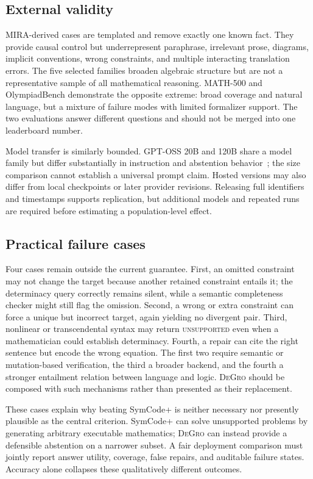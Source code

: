 \documentclass[sigconf,anonymous]{aamas}
\newcommand{\method}{\textsc{DeGro}}
\begin{document}
\subsection{External validity}
MIRA-derived cases are templated and remove exactly one known fact.  They provide causal control but underrepresent paraphrase, irrelevant prose, diagrams, implicit conventions, wrong constraints, and multiple interacting translation errors.  The five selected families broaden algebraic structure but are not a representative sample of all mathematical reasoning.  MATH-500 and OlympiadBench demonstrate the opposite extreme: broad coverage and natural language, but a mixture of failure modes with limited formalizer support.  The two evaluations answer different questions and should not be merged into one leaderboard number.

Model transfer is similarly bounded.  GPT-OSS 20B and 120B share a model family but differ substantially in instruction and abstention behavior~\cite{openai2025gptoss}; the size comparison cannot establish a universal prompt claim.  Hosted versions may also differ from local checkpoints or later provider revisions.  Releasing full identifiers and timestamps supports replication, but additional models and repeated runs are required before estimating a population-level effect.

\subsection{Practical failure cases}
Four cases remain outside the current guarantee.  First, an omitted constraint may not change the target because another retained constraint entails it; the determinacy query correctly remains silent, while a semantic completeness checker might still flag the omission.  Second, a wrong or extra constraint can force a unique but incorrect target, again yielding no divergent pair.  Third, nonlinear or transcendental syntax may return \textsc{unsupported} even when a mathematician could establish determinacy.  Fourth, a repair can cite the right sentence but encode the wrong equation.  The first two require semantic or mutation-based verification, the third a broader backend, and the fourth a stronger entailment relation between language and logic.  \method{} should be composed with such mechanisms rather than presented as their replacement.

These cases explain why beating SymCode+ is neither necessary nor presently plausible as the central criterion.  SymCode+ can solve unsupported problems by generating arbitrary executable mathematics; \method{} can instead provide a defensible abstention on a narrower subset.  A fair deployment comparison must jointly report answer utility, coverage, false repairs, and auditable failure states.  Accuracy alone collapses these qualitatively different outcomes.
\end{document}
